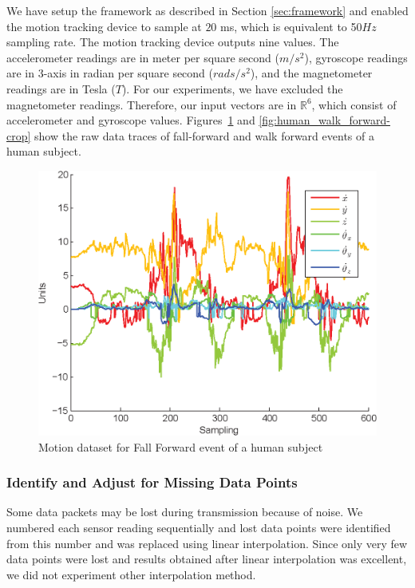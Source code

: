 \documentclass{IEEEtran}
\begin{document}
We have setup the framework as described in Section \ref{sec:framework} and enabled the 
motion tracking device to sample at $20$ ms, which is equivalent to 50$Hz$ 
sampling rate. The motion tracking device outputs nine values. The  
accelerometer readings are in  meter per square second ($m/s^2$), gyroscope readings are 
in 3-axis in radian per square second ($rads/s^2$), and the magnetometer readings are  in 
Tesla ($T$). For our experiments, we have excluded the magnetometer readings. Therefore, 
our input vectors are in $\mathbb{R}^6$, which consist of accelerometer and gyroscope 
values. Figures~\ref{fig:human_fall_forward_crop} and \ref{fig:human_walk_forward-crop} 
show the raw data traces of fall-forward and walk forward events of a human subject.
\begin{figure}[htb]
	\centering
		\includegraphics[width=0.95\columnwidth]{plots/human_falling-crop.eps}
	\caption{Motion dataset for  Fall Forward event of a human subject}
	\label{fig:human_fall_forward_crop}
\end{figure}


\subsubsection{Identify and Adjust for Missing Data Points}
\label{sec:IdentifyAndAdjustForMissingDataPoints}
Some data packets may be lost during transmission because of noise. We numbered each 
sensor reading sequentially and lost data points were identified from this number and was 
replaced using linear interpolation. Since only very few data points were lost and 
results obtained after linear interpolation was excellent, we did not experiment other 
interpolation method.
\end{document}
